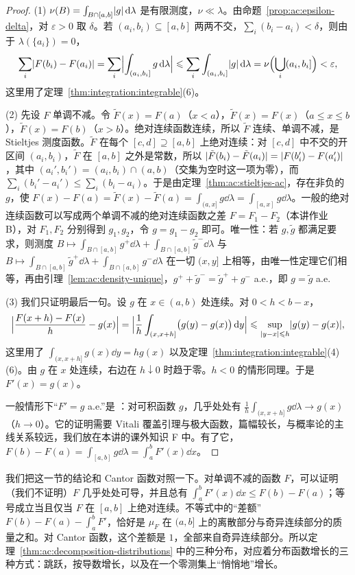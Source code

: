 \begin{proof}
(1) $\nu(B)=\int_{B\cap[a,b]}\lvert g\rvert\,\mathrm{d}\lambda$ 是有限测度，$\nu\ll\lambda$。由命题~\ref{prop:ac:epsilon-delta}，对 $\varepsilon>0$ 取 $\delta$。若 $(a_i,b_i)\subseteq[a,b]$ 两两不交，$\sum_i(b_i-a_i)<\delta$，则由于 $\lambda(\{a_i\})=0$，
\[
\sum_i\lvert F(b_i)-F(a_i)\rvert=\sum_i\Bigl|\int_{(a_i,b_i]}g\,\mathrm{d}\lambda\Bigr|\leqslant\sum_i\int_{(a_i,b_i]}\lvert g\rvert\,\mathrm{d}\lambda=\nu\Bigl(\bigcup_i(a_i,b_i]\Bigr)<\varepsilon,
\]
这里用了定理~\ref{thm:integration:integrable}(6)。

(2) 先设 $F$ 单调不减。令 $\tilde F(x)=F(a)$（$x<a$），$\tilde F(x)=F(x)$（$a\leqslant x\leqslant b$），$\tilde F(x)=F(b)$（$x>b$）。绝对连续函数连续，所以 $\tilde F$ 连续、单调不减，是 Stieltjes 测度函数。$\tilde F$ 在每个 $[c,d]\supseteq[a,b]$ 上绝对连续：对 $[c,d]$ 中不交的开区间 $(a_i,b_i)$，$\tilde F$ 在 $[a,b]$ 之外是常数，所以 $\lvert \tilde F(b_i)-\tilde F(a_i)\rvert=\lvert F(b_i')-F(a_i')\rvert$，其中 $(a_i',b_i')=(a_i,b_i)\cap(a,b)$（交集为空时这一项为零），而 $\sum_i(b_i'-a_i')\leqslant\sum_i(b_i-a_i)$。于是由定理~\ref{thm:ac:stieltjes-ac}，存在非负的 $g$，使 $F(x)-F(a)=\tilde F(x)-\tilde F(a)=\int_{(a,x]}g\dd\lambda=\int_{[a,x]}g\dd\lambda$。一般的绝对连续函数可以写成两个单调不减的绝对连续函数之差 $F=F_1-F_2$（本讲作业 B），对 $F_1,F_2$ 分别得到 $g_1,g_2$，令 $g=g_1-g_2$ 即可。唯一性：若 $g,\tilde g$ 都满足要求，则测度 $B\mapsto\int_{B\cap[a,b]}g^+\dd\lambda+\int_{B\cap[a,b]}\tilde g^-\dd\lambda$ 与 $B\mapsto\int_{B\cap[a,b]}\tilde g^+\dd\lambda+\int_{B\cap[a,b]}g^-\dd\lambda$ 在一切 $(x,y]$ 上相等，由唯一性定理它们相等，再由引理~\ref{lem:ac:density-unique}，$g^++\tilde g^-=\tilde g^++g^-$ a.e.，即 $g=\tilde g$ a.e.

(3) 我们只证明最后一句。设 $g$ 在 $x\in(a,b)$ 处连续。对 $0<h<b-x$，
\[
\Bigl|\frac{F(x+h)-F(x)}h-g(x)\Bigr|=\Bigl|\frac1h\int_{(x,x+h]}\bigl(g(y)-g(x)\bigr)\,\mathrm{d} y\Bigr|\leqslant\sup_{\lvert y-x\rvert\leqslant h}\lvert g(y)-g(x)\rvert,
\]
这里用了 $\int_{(x,x+h]}g(x)\dd y=hg(x)$ 以及定理~\ref{thm:integration:integrable}(4)(6)。由 $g$ 在 $x$ 处连续，右边在 $h\downarrow0$ 时趋于零。$h<0$ 的情形同理。于是 $F'(x)=g(x)$。

一般情形下“$F'=g$ a.e.”是 ：对可积函数 $g$，几乎处处有 $\frac1h\int_{(x,x+h]}g\dd\lambda\to g(x)$（$h\to0$）。它的证明需要 Vitali 覆盖引理与极大函数，篇幅较长，与概率论的主线关系较远，我们放在本讲的课外知识 F 中。有了它，$F(b)-F(a)=\int_{[a,b]}g\dd\lambda=\int_a^bF'(x)\dd x$。
\end{proof}

\begin{remark}
我们把这一节的结论和 Cantor 函数对照一下。对单调不减的函数 $F$，可以证明（我们不证明）$F$ 几乎处处可导，并且总有 $\int_a^bF'(x)\dd x\leqslant F(b)-F(a)$；等号成立当且仅当 $F$ 在 $[a,b]$ 上绝对连续。不等式中的“差额”$F(b)-F(a)-\int_a^bF'$，恰好是 $\mu_F$ 在 $(a,b]$ 上的离散部分与奇异连续部分的质量之和。对 Cantor 函数，这个差额是 $1$，全部来自奇异连续部分。所以定理~\ref{thm:ac:decomposition-distributions} 中的三种分布，对应着分布函数增长的三种方式：跳跃，按导数增长，以及在一个零测集上“悄悄地”增长。
\end{remark}

